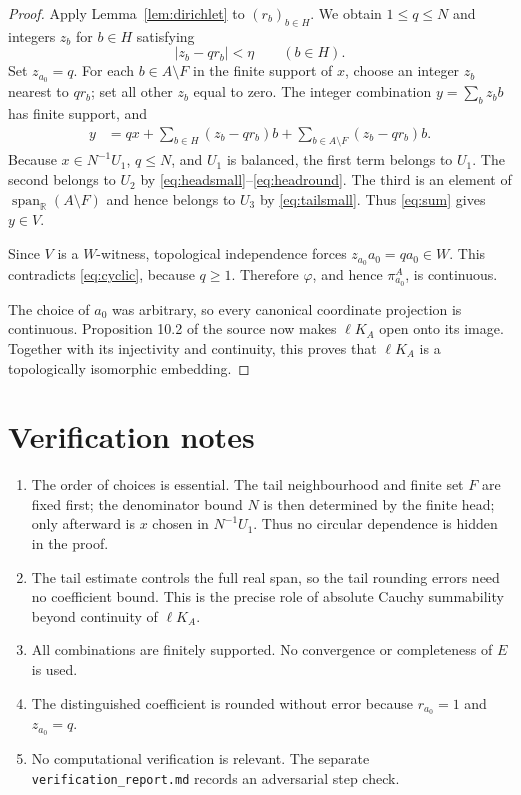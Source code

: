 \documentclass[11pt]{article}
\newcommand{\R}{\mathbb{R}}
\newcommand{\spanR}{\operatorname{span}_{\R}}
\newcommand{\lKA}{\ell K_A}
\begin{document}
\begin{proof}
Apply Lemma~\ref{lem:dirichlet} to $(r_b)_{b\in H}$. We obtain
$1\le q\le N$ and integers $z_b$ for $b\in H$ satisfying
\begin{equation}\label{eq:headround}
   |z_b-q r_b|<\eta\qquad(b\in H).
\end{equation}
Set $z_{a_0}=q$. For each $b\in A\setminus F$ in the finite support of $x$,
choose an integer $z_b$ nearest to $q r_b$; set all other $z_b$ equal to zero.
The integer combination $y=\sum_b z_b b$ has finite support, and
\begin{align*}
 y
 &=qx+
   \sum_{b\in H}(z_b-q r_b)b+
   \sum_{b\in A\setminus F}(z_b-q r_b)b.
\end{align*}
Because $x\in N^{-1}U_1$, $q\le N$, and $U_1$ is balanced, the first term
belongs to $U_1$. The second belongs to $U_2$ by
\eqref{eq:headsmall}--\eqref{eq:headround}. The third is an element of
$\spanR(A\setminus F)$ and hence belongs to $U_3$ by
\eqref{eq:tailsmall}. Thus \eqref{eq:sum} gives $y\in V$.

Since $V$ is a $W$-witness, topological independence forces
$z_{a_0}a_0=q a_0\in W$. This contradicts \eqref{eq:cyclic}, because
$q\ge1$. Therefore $\varphi$, and hence $\pi^A_{a_0}$, is continuous.

The choice of $a_0$ was arbitrary, so every canonical coordinate projection
is continuous. Proposition 10.2 of the source now makes $\lKA$ open onto its
image. Together with its injectivity and continuity, this proves that $\lKA$
is a topologically isomorphic embedding.
\end{proof}

\section{Verification notes}

\begin{enumerate}
\item The order of choices is essential. The tail neighbourhood and finite
set $F$ are fixed first; the denominator bound $N$ is then determined by the
finite head; only afterward is $x$ chosen in $N^{-1}U_1$. Thus no circular
dependence is hidden in the proof.
\item The tail estimate controls the full real span, so the tail rounding
errors need no coefficient bound. This is the precise role of absolute Cauchy
summability beyond continuity of $\lKA$.
\item All combinations are finitely supported. No convergence or completeness
of $E$ is used.
\item The distinguished coefficient is rounded without error because
$r_{a_0}=1$ and $z_{a_0}=q$.
\item No computational verification is relevant. The separate
\texttt{verification\_report.md} records an adversarial step check.
\end{enumerate}
\end{document}
